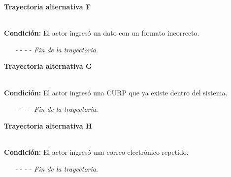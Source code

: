 \hypertarget{CU3-1:TAF}{\textbf{Trayectoria alternativa F}}\\
\noindent \textbf{Condición:} El actor ingresó un dato con un formato incorrecto.
\begin{enumerate}
	\UCpaso[\UCsist] Muestra el mensaje  señalando el campo que presenta el error en la pantalla .
	\UCpaso Regresa al paso \ref{CU3.1-P3} de la trayectoria principal.
	\item[- -] - - {\em {Fin de la trayectoria}}.
\end{enumerate}
\hypertarget{CU3-1:TAG}{\textbf{Trayectoria alternativa G}}\\
\noindent \textbf{Condición:} El actor ingresó una CURP que ya existe dentro del sistema.
\begin{enumerate}
	\UCpaso[\UCsist] Muestra el mensaje  señalando el campo que presenta la duplicidad en la pantalla .
	\UCpaso Regresa al paso \ref{CU3.1-P3} de la trayectoria principal.
	\item[- -] - - {\em {Fin de la trayectoria}}.
\end{enumerate}
\hypertarget{CU3-1:TAH}{\textbf{Trayectoria alternativa H}}\\
\noindent \textbf{Condición:} El actor ingresó una correo electrónico repetido.
\begin{enumerate}
	\UCpaso[\UCsist] Muestra el mensaje  señalando el campo que presenta la duplicidad en la pantalla .
	\UCpaso Regresa al paso \ref{CU3.1-P3} de la trayectoria principal.
	\item[- -] - - {\em {Fin de la trayectoria}}.
\end{enumerate}

